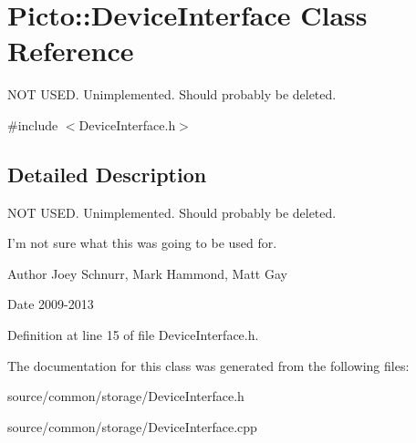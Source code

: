 \hypertarget{class_picto_1_1_device_interface}{\section{Picto\-:\-:Device\-Interface Class Reference}
\label{class_picto_1_1_device_interface}
}


N\-O\-T U\-S\-E\-D. Unimplemented. Should probably be deleted.  




{\ttfamily \#include $<$Device\-Interface.\-h$>$}



\subsection{Detailed Description}
N\-O\-T U\-S\-E\-D. Unimplemented. Should probably be deleted. 

I'm not sure what this was going to be used for. \begin{DoxyAuthor}{Author}
Joey Schnurr, Mark Hammond, Matt Gay 
\end{DoxyAuthor}
\begin{DoxyDate}{Date}
2009-\/2013 
\end{DoxyDate}


Definition at line 15 of file Device\-Interface.\-h.



The documentation for this class was generated from the following files\-:\begin{DoxyCompactItemize}
\item 
source/common/storage/Device\-Interface.\-h\item 
source/common/storage/Device\-Interface.\-cpp\end{DoxyCompactItemize}
